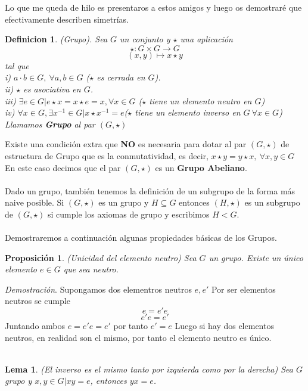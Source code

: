 \documentclass[12pt]{article}
\newtheorem{defi}{Definicion}
\newtheorem{prop}{Proposición}
\newtheorem{lem}{Lema}
\begin{document}
Lo que me queda de hilo es presentaros a estos amigos y luego os demostraré que efectivamente describen simetrías. \\ 
\begin{defi}
    (Grupo). Sea $G$ un conjunto y $\star$ una aplicación\\
$$\star: G\times G\rightarrow G$$
$$(x,y)\mapsto x\star y$$
tal que\\
i) $a\cdot b\in G, \ \forall a,b\in G$ ($\star$ es cerrada en $G$).\\
ii) $\star$ es asociativa en $G$.\\
iii) $\exists e\in G| e\star x=x\star e =x, \forall x\in G$ ($\star$ tiene un elemento neutro en $G$)\\
iv) $\forall x \in G, \exists x^{-1}\in G | x\star x^{-1}= e$($\star$ tiene un elemento inverso en $G \ \forall x\in G$)\\
Llamamos \textbf{Grupo} al par $(G,\star)$ \\
\end{defi}
\noindent Existe una condición extra que \textbf{NO} es necesaria para dotar al par $(G,\star)$ de estructura de Grupo que es la conmutatividad, es decir, $x\star y= y\star x, \ \forall x,y \in G$ En este caso decimos que el par $(G,\star)$ es un \textbf{Grupo Abeliano}. \\\\
Dado un grupo, también tenemos la definición de un subgrupo de la forma más naive posible. Si $(G,\star)$ es un grupo y $H\subseteq G$ entonces $(H,\star)$ es un subgrupo de $(G, \star)$ si cumple los axiomas de grupo y escribimos $H<G$.\\\\
Demostraremos a continuación algunas propiedades básicas de los Grupos.\\
\begin{prop}
    (Unicidad del elemento neutro) Sea $G$ un grupo. Existe un único elemento $e\in G$ que sea neutro.\\
\end{prop}
\textit{Demostración}. Supongamos dos elementros neutros $e,e'$ Por ser elementos neutros se cumple 
$$e=e'e$$
$$e'e=e'$$
Juntando ambos $e=e'e=e'$ por tanto $e'=e$ Luego si hay dos elementos neutros, en realidad son el mismo, por tanto el elemento neutro es único.\\\\
\begin{lem}
    (El inverso es el mismo tanto por izquierda como por la derecha) Sea $G$ grupo y $x,y\in G | xy=e$, entonces $yx=e$.
\end{lem}
\end{document}
